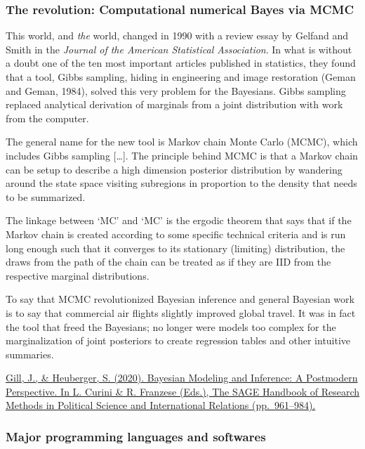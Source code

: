 \documentclass[
  11pt,
]{article}
\begin{document}
\hypertarget{the-revolution-computational-numerical-bayes-via-mcmc}{%
\subsubsection{The revolution: Computational numerical Bayes via MCMC}\label{the-revolution-computational-numerical-bayes-via-mcmc}}

This world, and \emph{the} world, changed in 1990 with a review essay by Gelfand and Smith in the \emph{Journal of the American Statistical Association}. In what is without a doubt one of the ten most important articles published in statistics, they found that a tool, Gibbs sampling, hiding in engineering and image restoration (Geman and Geman, 1984), solved this very problem for the Bayesians. Gibbs sampling replaced analytical derivation of marginals from a joint distribution with work from the computer.

The general name for the new tool is Markov chain Monte Carlo (MCMC), which includes Gibbs sampling {[}\ldots{]}. The principle behind MCMC is that a Markov chain can be setup to describe a high dimension posterior distribution by wandering around the state space visiting subregions in proportion to the density that needs to be summarized.

The linkage between `MC' and `MC' is the ergodic theorem that says that if the Markov chain is created according to some specific technical criteria and is run long enough such that it converges to its stationary (limiting) distribution, the draws from the path of the chain can be treated as if they are IID from the respective marginal distributions.

To say that MCMC revolutionized Bayesian inference and general Bayesian work is to say that commercial air flights slightly improved global travel. It was in fact the tool that freed the Bayesians; no longer were models too complex for the marginalization of joint posteriors to create regression tables and other intuitive summaries.

\href{https://jeffgill.org/wp-content/uploads/2021/04/curini_franzese_v2_chp50_1pp_01.pdf}{Gill, J., \& Heuberger, S. (2020). Bayesian Modeling and Inference: A Postmodern Perspective. In L. Curini \& R. Franzese (Eds.), The SAGE Handbook of Research Methods in Political Science and International Relations (pp.~961--984).}

\hypertarget{major-programming-languages-and-softwares}{%
\subsubsection{Major programming languages and softwares}\label{major-programming-languages-and-softwares}}
\end{document}
